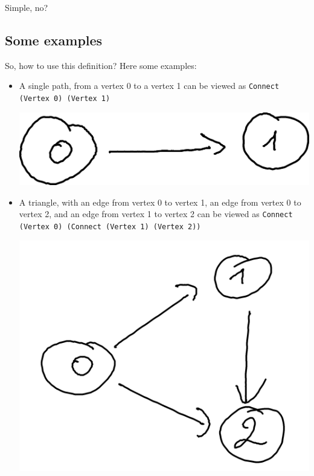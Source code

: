 \documentclass[10pt,a4paper]{article}
\begin{document}
Simple, no?

\subsection{Some examples}

So, how to use this definition? Here some examples:

\begin{itemize}
	\item A single path, from a vertex 0 to a vertex 1 can be viewed as \verb|Connect (Vertex 0) (Vertex 1)| 
	\begin{center}
	\includegraphics[scale=0.5]{figspng/e2.png}
	\end{center}
	\item A triangle, with an edge from vertex 0 to vertex 1, an edge from vertex 0 to vertex 2, and an edge from vertex 1 to vertex 2 can be viewed as  \verb|Connect (Vertex 0) (Connect (Vertex 1) (Vertex 2))| 
	\begin{center}
	\includegraphics[scale=0.5]{figspng/e1.png}
	\end{center}

\end{itemize}
\end{document}
